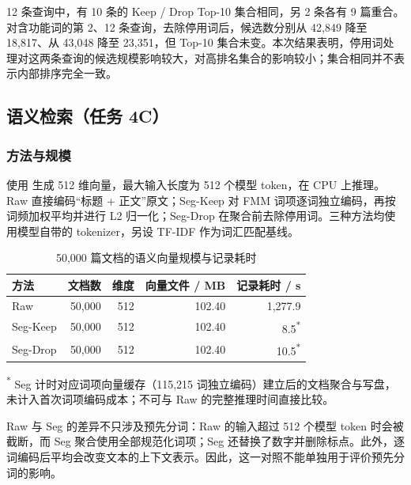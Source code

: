 \documentclass[UTF8,a4paper,11pt,fontset=fandol]{ctexart}
\begin{document}
12 条查询中，有 10 条的 Keep / Drop Top-10 集合相同，另 2 条各有 9 篇重合。对含功能词的第 2、12 条查询，去除停用词后，候选数分别从 42,849 降至 18,817、从 43,048 降至 23,351，但 Top-10 集合未变。本次结果表明，停用词处理对这两条查询的候选规模影响较大，对高排名集合的影响较小；集合相同并不表示内部排序完全一致。

\subsection{语义检索（任务 4C）}
\subsubsection{方法与规模}
使用  生成 512 维向量，最大输入长度为 512 个模型 token，在 CPU 上推理。Raw 直接编码“标题 + 正文”原文；Seg-Keep 对 FMM 词项逐词独立编码，再按词频加权平均并进行 L2 归一化；Seg-Drop 在聚合前去除停用词。三种方法均使用模型自带的 tokenizer，另设 TF-IDF 作为词汇匹配基线。

\begin{table}[H]\centering\small
\caption{50,000 篇文档的语义向量规模与记录耗时}
\begin{tabular}{@{}lrrrr@{}}\toprule
方法 & 文档数 & 维度 & 向量文件 / MB & 记录耗时 / s \\ \midrule
Raw & 50,000 & 512 & 102.40 & 1,277.9 \\
Seg-Keep & 50,000 & 512 & 102.40 & 8.5\textsuperscript{*} \\
Seg-Drop & 50,000 & 512 & 102.40 & 10.5\textsuperscript{*} \\
\bottomrule\end{tabular}
\vspace{2pt}\parbox{\linewidth}{\footnotesize\textsuperscript{*} Seg 计时对应词项向量缓存（115,215 词独立编码）建立后的文档聚合与写盘，未计入首次词项编码成本；不可与 Raw 的完整推理时间直接比较。}
\end{table}

Raw 与 Seg 的差异不只涉及预先分词：Raw 的输入超过 512 个模型 token 时会被截断，而 Seg 聚合使用全部规范化词项；Seg 还替换了数字并删除标点。此外，逐词编码后平均会改变文本的上下文表示。因此，这一对照不能单独用于评价预先分词的影响。
\end{document}
